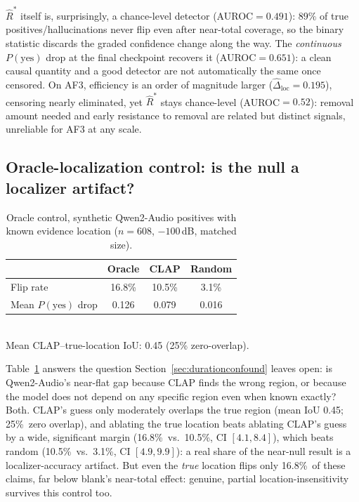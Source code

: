 \documentclass{article}
\newcommand{\oraclen}{608}
\newcommand{\oracleflipO}{16.8\%}
\newcommand{\oracleflipC}{10.5\%}
\newcommand{\oracleflipR}{3.1\%}
\newcommand{\oracledropO}{0.126}
\newcommand{\oracledropC}{0.079}
\newcommand{\oracledropR}{0.016}
\newcommand{\oracleiou}{0.45}
\newcommand{\oraclezero}{25\%}
\begin{document}
$\hat{R}^\ast$ itself is, surprisingly, a chance-level detector
(AUROC$=0.491$): $89\%$ of true positives/hallucinations never flip
even after near-total coverage, so the binary statistic discards the
graded confidence change along the way. The \emph{continuous}
$P(\text{yes})$ drop at the final checkpoint recovers it
(AUROC$=0.651$): a clean causal quantity and a good detector are not
automatically the same once censored. On AF3, efficiency is an order
of magnitude larger ($\widehat{\Delta}_{\text{loc}}{=}0.195$), censoring
nearly eliminated, yet $\hat{R}^\ast$ stays chance-level
(AUROC$=0.52$): removal amount needed and early resistance to removal
are related but distinct signals, unreliable for AF3 at any scale.

\subsection{Oracle-localization control: is the null a localizer artifact?}\label{sec:oracle}

\begin{table}[t]
\centering
\footnotesize
\caption{Oracle control, synthetic Qwen2-Audio positives with known evidence location ($n{=}\oraclen$, $-100$\,dB, matched size).}
\label{tab:oracle}
\begin{tabular}{@{}lccc@{}}
\toprule
& Oracle & CLAP & Random \\
\midrule
Flip rate & \oracleflipO & \oracleflipC & \oracleflipR \\
Mean $P(\text{yes})$ drop & \oracledropO & \oracledropC & \oracledropR \\
\bottomrule
\end{tabular}
\vspace{2pt}
\\ Mean CLAP--true-location IoU: \oracleiou{} (\oraclezero{} zero-overlap).
\end{table}

Table~\ref{tab:oracle} answers the question Section~\ref{sec:durationconfound}
leaves open: is Qwen2-Audio's near-flat gap because CLAP finds the
wrong region, or because the model does not depend on any specific
region even when known exactly? Both. CLAP's guess only moderately
overlaps the true region (mean IoU \oracleiou; \oraclezero\ zero
overlap), and ablating the true location beats ablating CLAP's guess by
a wide, significant margin (\oracleflipO\ vs.\ \oracleflipC, CI $[4.1,
8.4]$), which beats random (\oracleflipC\ vs.\ \oracleflipR, CI $[4.9,
9.9]$): a real share of the near-null result is a localizer-accuracy
artifact. But even the \emph{true} location flips only \oracleflipO\ of
these claims, far below blank's near-total effect: genuine, partial
location-insensitivity survives this control too.
\end{document}
